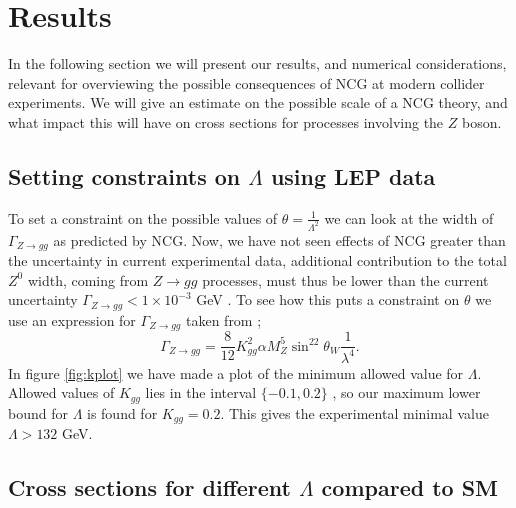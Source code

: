 \section{Results}
In the following section we will present our results, and numerical considerations, relevant for overviewing the possible consequences of NCG at modern collider experiments. We will give an estimate on the possible scale of a NCG theory, and what impact this will have on cross sections for processes involving the $Z$ boson.

\subsection{Setting constraints on $\Lambda$ using LEP data}
To set a constraint on the possible values of $\theta = \frac{1}{\Lambda^2}$ we can look at the width of $\Gamma_{Z \rightarrow gg}$ as predicted by NCG. Now, we have not seen effects of NCG greater than the uncertainty in current experimental data, additional contribution to the total $Z^0$ width, coming from $Z \rightarrow gg$ processes, must thus be lower than the current uncertainty $\Gamma_{Z \rightarrow gg} < 1 \times 10^{-3}$ GeV \cite{behr2003dnc}. To see how this puts a constraint on $\theta$ we use an expression for $\Gamma_{Z \rightarrow gg}$ taken from \cite{behr2003dnc};
\begin{equation} \label{eq:zggwidth}
	\Gamma_{Z \rightarrow gg} = \frac{8}{12} K_{gg}^2 \alpha M_Z^5 \sin^22\theta_W \frac{1}{\lambda^4}.
\end{equation}
In figure \ref{fig:kplot} we have made a plot of the minimum allowed value for $\Lambda$. Allowed values of $K_{gg}$ lies in the interval $\{-0.1,0.2\}$ \cite{behr2003dnc}, so our maximum lower bound for $\Lambda$ is found for $K_{gg}=0.2$. This gives the experimental minimal value $\Lambda >132$ GeV.

\subsection{Cross sections for different $\Lambda$ compared to SM}


